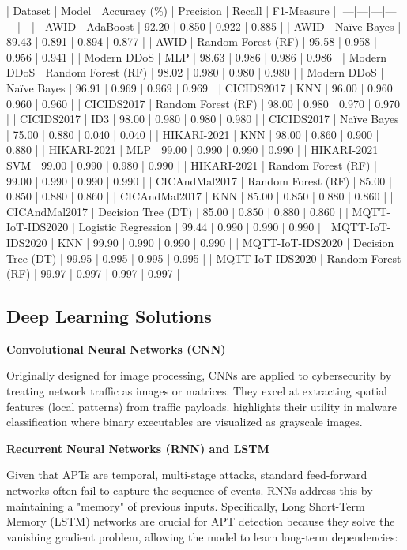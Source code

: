 | Dataset | Model | Accuracy (\%) | Precision | Recall | F1-Measure |
|---|---|---|---|---|---|
| AWID | AdaBoost | 92.20 | 0.850 | 0.922 | 0.885 |
| AWID | Naïve Bayes | 89.43 | 0.891 | 0.894 | 0.877 |
| AWID | Random Forest (RF) | 95.58 | 0.958 | 0.956 | 0.941 |
| Modern DDoS | MLP | 98.63 | 0.986 | 0.986 | 0.986 |
| Modern DDoS | Random Forest (RF) | 98.02 | 0.980 | 0.980 | 0.980 |
| Modern DDoS | Naïve Bayes | 96.91 | 0.969 | 0.969 | 0.969 |
| CICIDS2017 | KNN | 96.00 | 0.960 | 0.960 | 0.960 |
| CICIDS2017 | Random Forest (RF) | 98.00 | 0.980 | 0.970 | 0.970 |
| CICIDS2017 | ID3 | 98.00 | 0.980 | 0.980 | 0.980 |
| CICIDS2017 | Naïve Bayes | 75.00 | 0.880 | 0.040 | 0.040 |
| HIKARI-2021 | KNN | 98.00 | 0.860 | 0.900 | 0.880 |
| HIKARI-2021 | MLP | 99.00 | 0.990 | 0.990 | 0.990 |
| HIKARI-2021 | SVM | 99.00 | 0.990 | 0.980 | 0.990 |
| HIKARI-2021 | Random Forest (RF) | 99.00 | 0.990 | 0.990 | 0.990 |
| CICAndMal2017 | Random Forest (RF) | 85.00 | 0.850 | 0.880 | 0.860 |
| CICAndMal2017 | KNN | 85.00 | 0.850 | 0.880 | 0.860 |
| CICAndMal2017 | Decision Tree (DT) | 85.00 | 0.850 | 0.880 | 0.860 |
| MQTT-IoT-IDS2020 | Logistic Regression | 99.44 | 0.990 | 0.990 | 0.990 |
| MQTT-IoT-IDS2020 | KNN | 99.90 | 0.990 | 0.990 | 0.990 |
| MQTT-IoT-IDS2020 | Decision Tree (DT) | 99.95 | 0.995 | 0.995 | 0.995 |
| MQTT-IoT-IDS2020 | Random Forest (RF) | 99.97 | 0.997 | 0.997 | 0.997 |

\subsection{Deep Learning Solutions}

\textbf{Convolutional Neural Networks (CNN)}

Originally designed for image processing, CNNs are applied to cybersecurity by treating network traffic as images or matrices. They excel at extracting spatial features (local patterns) from traffic payloads. \cite{ankalaki2025cyber} highlights their utility in malware classification where binary executables are visualized as grayscale images.

\textbf{Recurrent Neural Networks (RNN) and LSTM}

Given that APTs are temporal, multi-stage attacks, standard feed-forward networks often fail to capture the sequence of events. RNNs address this by maintaining a "memory" of previous inputs. Specifically, Long Short-Term Memory (LSTM) networks are crucial for APT detection because they solve the vanishing gradient problem, allowing the model to learn long-term dependencies:

